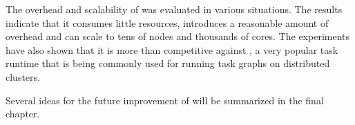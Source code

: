 The overhead and scalability of \hyperqueue{} was evaluated in various situations. The
results indicate that it consumes little resources, introduces a reasonable amount of overhead and
can scale to tens of nodes and thousands of cores. The experiments have also shown that it is more
than competitive against \dask{}, a very popular task runtime that is being
commonly used for running task graphs on distributed clusters.

Several ideas for the future improvement of \hyperqueue{} will be summarized in the
final chapter.

